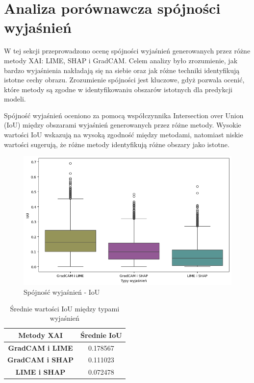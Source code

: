 \section*{Analiza porównawcza spójności wyjaśnień}

W tej sekcji przeprowadzono ocenę spójności wyjaśnień generowanych przez różne metody XAI: LIME, SHAP i GradCAM.
Celem analizy było zrozumienie, jak bardzo wyjaśnienia nakładają się na siebie oraz jak różne techniki identyfikują istotne cechy obrazu.
Zrozumienie spójności jest kluczowe, gdyż pozwala ocenić, które metody są zgodne w identyfikowaniu obszarów istotnych dla predykcji modeli.

Spójność wyjaśnień oceniono za pomocą współczynnika Intersection over Union (IoU) między obszarami wyjaśnień generowanych przez różne metody.
Wysokie wartości IoU wskazują na wysoką zgodność między metodami, natomiast niskie wartości sugerują, że różne metody identyfikują różne obszary jako istotne.

\begin{figure}[h]
	\centering\includegraphics[width=.9\textwidth]{img/base_coherence}
	\caption{Spójność wyjaśnień - IoU}  \label{rys:base_coherence}
\end{figure}

\begin{table}[h]
	\centering
	\begin{tabular}{|c|c|}
		\hline
		\textbf{Metody XAI}     & \textbf{Średnie IoU} \\
		\hline
		\textbf{GradCAM i LIME} & 0.178567             \\
		\hline
		\textbf{GradCAM i SHAP} & 0.111023             \\
		\hline
		\textbf{LIME i SHAP}    & 0.072478             \\
		\hline
	\end{tabular}
	\caption{Średnie wartości IoU między typami wyjaśnień}
	\label{tab:base_coherence}
\end{table}

